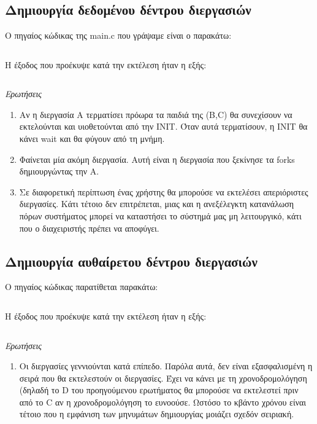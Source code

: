 \documentclass[a4paper,10pt]{article} \usepackage{anysize}
\begin{document}


\section*{} \setcounter{section}{1}
\subsection{Δημιουργία δεδομένου δέντρου διεργασιών} Ο πηγαίος κώδικας της
main.c που γράψαμε είναι ο παρακάτω:
\inputminted[linenos,fontsize=\footnotesize,frame=leftline]{c}{files/ask2-fork.c}

Η έξοδος που προέκυψε κατά την εκτέλεση ήταν η εξής:
\inputminted[linenos,fontsize=\footnotesize,frame=leftline]{bash}{files/ask2-fork.out}
\pagebreak

\emph{Ερωτήσεις}
\begin{enumerate}
\item Αν η διεργασία A τερματίσει πρόωρα τα παιδιά της (B,C) θα συνεχίσουν να
εκτελούνται και υιοθετούνται από την INIT. Όταν αυτά τερματίσουν, η INIT θα
κάνει wait και θα φύγουν από τη μνήμη.
\item Φαίνεται μία ακόμη διεργασία. Αυτή είναι η διεργασία που ξεκίνησε τα
forks δημιουργώντας την A.
\item Σε διαφορετική περίπτωση ένας χρήστης θα μπορούσε να εκτελέσει
απεριόριστες διεργασίες. Κάτι τέτοιο δεν επιτρέπεται, μιας και η ανεξέλεγκτη
κατανάλωση πόρων συστήματος μπορεί να καταστήσει το σύστημά μας μη
λειτουργικό, κάτι που ο διαχειριστής πρέπει να αποφύγει.\\
\end{enumerate}


\subsection{Δημιουργία αυθαίρετου δέντρου διεργασιών} Ο πηγαίος κώδικας
παρατίθεται παρακάτω:
\inputminted[linenos,fontsize=\footnotesize,frame=leftline]{c}{files/ask2-tree.c}

Η έξοδος που προέκυψε κατά την εκτέλεση ήταν η εξής:
\inputminted[linenos,fontsize=\footnotesize,frame=leftline]{bash}{files/ask2-tree.out}
\emph{Ερωτήσεις}
\begin{enumerate}
\item Οι διεργασίες γεννιούνται κατά επίπεδο. Παρόλα αυτά, δεν είναι
εξασφαλισμένη η σειρά που θα εκτελεστούν οι διεργασίες. Έχει να κάνει με τη
χρονοδρομολόγηση (δηλαδή το D του προηγούμενου ερωτήματος θα μπορούσε να
εκτελεστεί πριν από το C αν η χρονοδρομολόγηση το ευνοούσε.
Ωστόσο το κβάντο χρόνου είναι τέτοιο που η εμφάνιση των
μηνυμάτων δημιουργίας μοιάζει σχεδόν σειριακή.
\end{enumerate}
\end{document}
